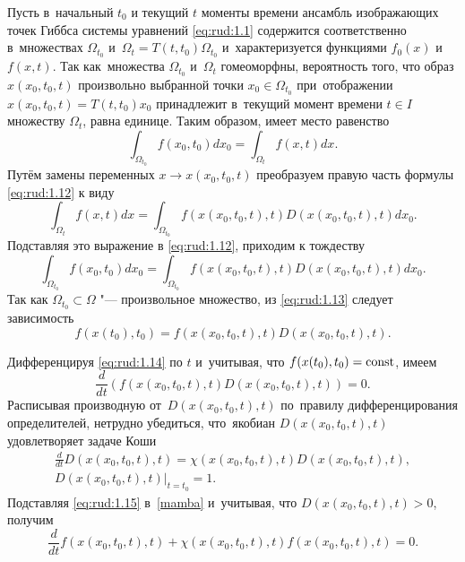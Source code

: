  Пусть в~начальный $t_0$ и текущий $t$ моменты времени ансамбль
 изображающих точек Гиббса системы уравнений \eqref{eq:rud:1.1} содержится
 соответственно в~множествах $\Omega_{t_0}$ и~$\Omega_t=T(t,t_0)\Omega_{t_0}$ и~характеризуется функциями $f_0(x)$
 и $f(x,t)$. Так как~множества $\Omega_{t_0}$ и~$\Omega_t$
 гомеоморфны, вероятность того, что образ $x(x_0,t_0,t)$
 произвольно выбранной точки $x_0\in\Omega_{t_0}$ при~отображении
 $x(x_0,t_0,t)=T(t,t_0)x_0$ принадлежит в~текущий момент времени
 $t\in I$ множеству $\Omega_t$, равна единице. Таким образом,
 имеет место равенство
 \begin{equation}
 \int _{\Omega_{t_0}}f(x_0,t_0)dx_0=\int _{\Omega_t}f(x,t)dx.\label{eq:rud:1.12}
 \end{equation}
Путём замены переменных $x\to  x(x_0,t_0,t)$
 преобразуем правую часть формулы \eqref{eq:rud:1.12} к виду
 $$
 \int _{\Omega_t}f(x,t)dx=\int _{\Omega_{t_0}}f(x(x_0,t_0,t),t)D(x(x_0,t_0,t),t)dx_0.
 $$
 Подставляя это выражение в \eqref{eq:rud:1.12}, приходим к тождеству
 \begin{equation}
\int _{\Omega_{t_0}}f(x_0,t_0)dx_0=\int _{\Omega_{t_0}}f(x(x_0,t_0,t),t)D(x(x_0,t_0,t),t)dx_0.\label{eq:rud:1.13}
\end{equation}
Так как $\Omega_{t_0}\subset\Omega$ "--- произвольное множество,
 из \eqref{eq:rud:1.13} следует зависимость
\begin{equation}
f(x(t_0),t_0)=f(x(x_0,t_0,t),t)D(x(x_0,t_0,t),t).\label{eq:rud:1.14}
\end{equation}

Дифференцируя \eqref{eq:rud:1.14} по $t$ и~учитывая, что
$f(x(t_0),t_0)=\rm const$, имеем
\begin{equation}
\frac{d}{dt}(f(x(x_0,t_0,t),t)D(x(x_0,t_0,t),t))=0.
\label{mamba}
\end{equation}
Расписывая производную от~$D(x(x_0,t_0,t),t)$ по~правилу
дифференцирования определителей, нетрудно убедиться, что~якобиан
$D(x(x_0,t_0,t),t)$ удовлетворяет задаче Коши
\begin{equation}
\begin{array}{c}
\displaystyle \frac{d}{dt}D(x(x_0,t_0,t),t)=\chi(x(x_0,t_0,t),t) D(x(x_0,t_0,t),t),\\
D(x(x_0,t_0,t),t)\big|_{t=t_0}=1.
\end{array}
\label{eq:rud:1.15}
\end{equation}
Подставляя \eqref{eq:rud:1.15} в~\eqref{mamba}
и~учитывая, что \mbox{$D(x(x_0,t_0,t),t)>0$}, получим
\begin{equation}
\frac{d}{dt}f(x(x_0,t_0,t),t)+\chi(x(x_0,t_0,t),t) f(x(x_0,t_0,t),t)=0.\label{eq:rud:1.16}
\end{equation}


